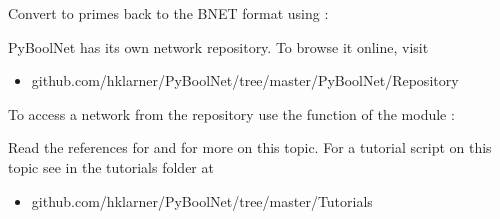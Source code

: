 \documentclass[letterpaper,10pt,english]{sphinxmanual}
\begin{document}
Convert to primes back to the BNET format using {\hyperref[\detokenize{FileExchange:primes2bnet}]{}}:

\begin{sphinxVerbatim}[commandchars=\\\{\}]


\end{sphinxVerbatim}

PyBoolNet has its own network repository.
To browse it online, visit
\begin{itemize}
\item {} 
github.com/hklarner/PyBoolNet/tree/master/PyBoolNet/Repository

\end{itemize}

To access a network from the repository use the function  of the module :

\begin{sphinxVerbatim}[commandchars=\\\{\}]
  
\end{sphinxVerbatim}

Read the references for {\hyperref[\detokenize{FileExchange:fileexchange}]{}} and {\hyperref[\detokenize{PrimeImplicants:primeimplicants}]{}} for more on this topic.
For a tutorial script on this topic see  in the tutorials folder at
\begin{itemize}
\item {} 
github.com/hklarner/PyBoolNet/tree/master/Tutorials

\end{itemize}
\end{document}
